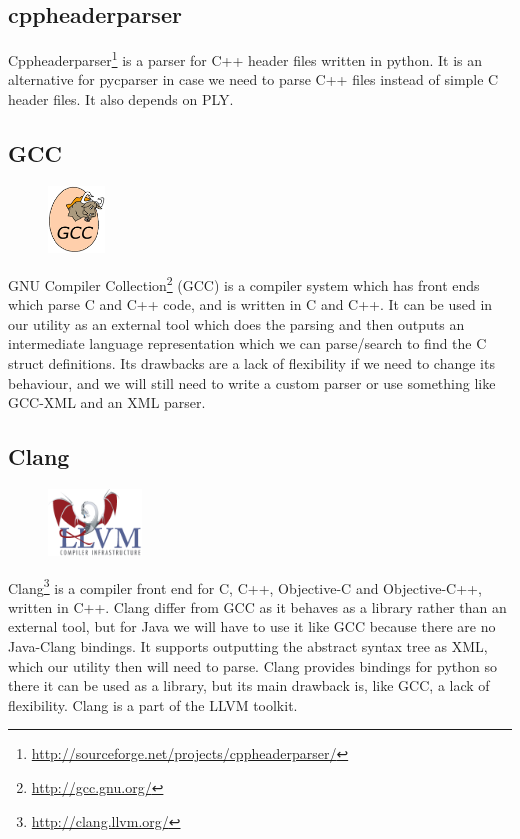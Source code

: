 \subsection{cppheaderparser}
Cppheaderparser\footnote{\url{http://sourceforge.net/projects/cppheaderparser/}}
is a parser for C++ header files written in python. It is an alternative for
pycparser in case we need to parse C++ files instead of simple C header files.
It also depends on PLY.

\subsection{GCC}
\begin{figure}
	\begin{center}
	\vspace{-30pt}
		\includegraphics[width=1.5cm]{./planning/img/gcc_logo}
	\vspace{-30pt}
	\end{center}
\end{figure}
GNU Compiler Collection\footnote{\url{http://gcc.gnu.org/}} (GCC) is a
compiler system which has front ends which parse C and C++ code, and is written
in C and C++. It can be used in our utility as an external tool which does the
parsing and then outputs an intermediate language representation which we can
parse/search to find the C struct definitions. Its drawbacks are a lack of
flexibility if we need to change its behaviour, and we will still need to write
a custom parser or use something like GCC-XML and an XML parser.

\subsection{Clang}
\begin{figure}
	\begin{center}
	\vspace{-30pt}
		\includegraphics[width=2.5cm]{./planning/img/llvm_logo}
	\vspace{-30pt}
	\end{center}
\end{figure}
Clang\footnote{\url{http://clang.llvm.org/}} is a compiler front end for C, 
C++, Objective-C and Objective-C++, written in C++. Clang differ from GCC as it
behaves as a library rather than an external tool, but for Java we will have to
use it like GCC because there are no Java-Clang bindings. It supports
outputting the abstract syntax tree as XML, which our utility then will need to
parse. Clang provides bindings for python so there it can be used as a library,
but its main drawback is, like GCC, a lack of flexibility. Clang is a part of
the LLVM toolkit.


